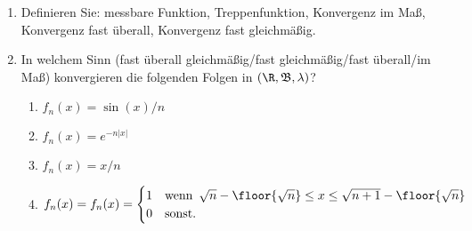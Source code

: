 
\begin{exercise}

\phantom{}

\begin{enumerate}[label = (\alph*)]

  \item
  Definieren Sie: messbare Funktion, Treppenfunktion, Konvergenz im Maß, Konvergenz fast überall, Konvergenz fast gleichmäßig.
  
  \item
  In welchem Sinn (fast überall gleichmäßig/fast gleichmäßig/fast überall/im Maß) konvergieren die folgenden Folgen in $(\R, \mathfrak{B}, \lambda)$?
  
  \begin{enumerate}[label = \roman*.]
  
    \item
    $f_n(x) = \sin(x)/n$

    \item
    $f_n(x) = e^{-n |x|}$
    
    \item
    $f_n(x) = x/n$
    
    \item
    $f_n(x) = f_n(x) =
    \begin{cases}
      1 & \text{wenn} \enspace \sqrt{n} - \floor{\sqrt{n}} \leq x \leq \sqrt{n+1} - \floor{\sqrt{n}} \\
      0 & \text{sonst}.
    \end{cases}$

  \end{enumerate}

\end{enumerate}

\end{exercise}


